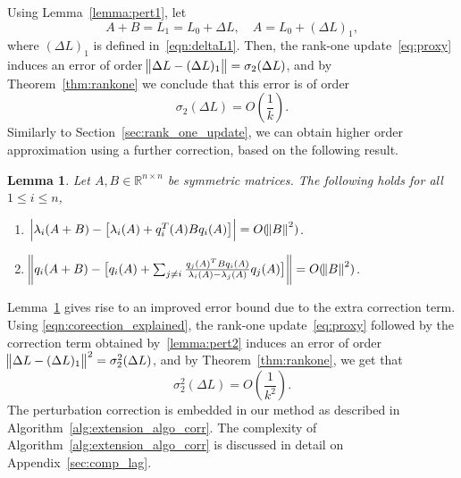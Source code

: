 \documentclass[11pt]{article}
\newtheorem{lemma}[theorem]{Lemma}
\begin{document}
\noindent
Using Lemma~\ref{lemma:pert1}, let 
\begin{equation} \label{eqn:coreection_explained}
A + B = L_1 = L_0 + \Delta L, \quad A = L_0 + (\Delta L)_1,
\end{equation}
where $(\Delta L)_1$ is defined in~\eqref{eqn:deltaL1}. Then, the rank-one update~\eqref{eq:proxy} induces an error of order  $\norm{\Delta L - (\Delta L)_1} =\sigma_2(\Delta L)$, and by Theorem~\ref{thm:rankone} we conclude that this error is of order
\[ \sigma_2(\Delta L) = O\left(\frac{1}{k}\right) . \]
Similarly to Section~\ref{sec:rank_one_update}, we can obtain higher order approximation using a further correction, based on the following result.
\begin{lemma} \label{lemma:pert2}
Let $A, B \in \mathbb{R}^{n \times n}$ be symmetric matrices. The following holds for all $1 \le i \le n$,
\begin{enumerate}	
	\item $\Big| \lambda_i(A + B) - \big[ \lambda_i(A) + q_i^T(A)Bq_i(A) \big]\Big| =  O(\norm{B}^2)$.
	\item $\norm{q_i(A + B) - \big[ q_i(A) + \sum_{j \neq i}{\frac{q_j(A)^T B q_i(A)}{\lambda_i(A) - \lambda_j(A)}q_j(A)}\big]} = O(\norm{B}^2)$.
\end{enumerate}
\end{lemma}

Lemma~\ref{lemma:pert2} gives rise to an improved error bound due to the extra correction term. Using \eqref{eqn:coreection_explained}, the rank-one update~\eqref{eq:proxy} followed by the correction term obtained by~\eqref{lemma:pert2} induces an error of order $\norm{\Delta L - (\Delta L)_1}^2 =\sigma_2^2(\Delta L)$, and by Theorem~\ref{thm:rankone}, we get that 
\[ \sigma_2^2(\Delta L) = O\left(\frac{1}{k^2}\right) . \] 
The perturbation correction is embedded in our method as described in Algorithm~\ref{alg:extension_algo_corr}. The complexity of Algorithm~\ref{alg:extension_algo_corr} is discussed in detail on Appendix~\ref{sec:comp_lag}.
\end{document}
